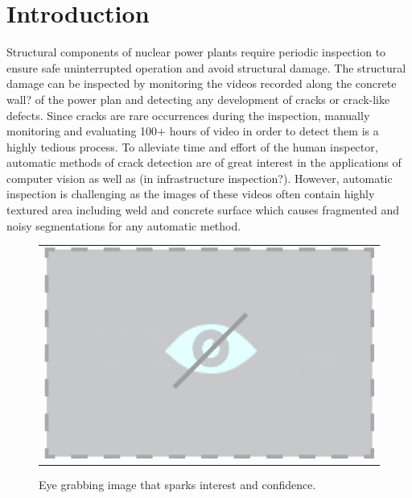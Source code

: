 




\section{Introduction}
    Structural components of nuclear power plants require periodic inspection to ensure safe uninterrupted operation and avoid structural damage. The structural damage can be inspected by monitoring the videos recorded along the concrete wall? of the power plan and detecting any development of cracks or crack-like defects. Since cracks are rare occurrences during the inspection, manually monitoring and evaluating 100+ hours of video in order to detect them is a highly tedious process. To alleviate time and effort of the human inspector, automatic methods of crack detection are of great interest in the applications of computer vision as well as (in infrastructure inspection?).   However, automatic inspection is challenging as the images of these videos often contain highly textured area including weld and concrete surface which causes fragmented and noisy segmentations for any automatic method.
 
\begin{figure} [ht]
\begin{centering}
\begin{tabular}{c}
\includegraphics[width=\columnwidth]{Images/NoVisualHolder.png}
\end{tabular}
\caption{Eye grabbing image that sparks interest and confidence.}
\label{fig:FigTease}
\end{centering}
\end{figure}
 

